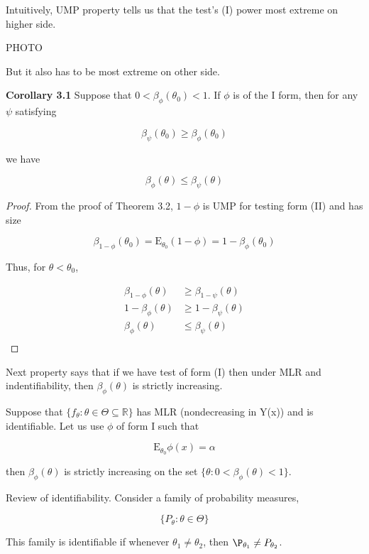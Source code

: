 \documentclass[11pt,fleqn]{book} %
\newcommand{\E}{\mathrm{E}}
\begin{document}
 Intuitively, UMP property tells us that the test's (I) power most extreme on higher side.

 PHOTO

 But it also has to be most extreme on other side.

 \textbf{Corollary 3.1} Suppose that $0 < \beta_\phi (\theta_0) <1$. If $\phi$ is of the I form, then for any $\psi$ satisfying

 		$$\beta_\psi (\theta_0) \geq \beta_\phi(\theta_0) $$

 we have 

 		$$ \beta_\phi (\theta) \leq \beta_\psi(\theta) $$

 \begin{proof}
 	From the proof of Theorem 3.2, $1 - \phi$ is UMP for testing form (II) and has size 

 			$$\beta_{1 - \phi}(\theta_0) = \E_{\theta_0} (1 - \phi) = 1 - \beta_\phi(\theta_0) $$

 	Thus, for $\theta< \theta_0$,

 			\begin{align*}
 				\beta_{1 - \phi}(\theta) &\geq \beta_{1 - \psi}(\theta)\\
 				1 - \beta_{\phi}(\theta) &\geq 1 - \beta_{\psi}(\theta)\\
 				\beta_{\phi}(\theta) &\leq \beta_{\psi}(\theta)\\
 			\end{align*}
 \end{proof}

 Next property says that if we have test of form (I) then under MLR and indentifiability, then $\beta_\phi(\theta)$ is strictly increasing. 

 \begin{theorem}[3.4]
 	Suppose that $\{f_\theta:\theta \in \Theta \subseteq \mathbb{R}\}$ has MLR (nondecreasing in Y(x)) and is identifiable. Let us use $\phi$ of form I such that

 			$$\E_{\theta_0} \phi(x) = \alpha $$

 	then $\beta_\phi (\theta)$ is strictly increasing on the set $\{\theta: 0 < \beta_\phi(\theta) < 1\}$. 
 \end{theorem}

 \begin{remark}
 	Review of identifiability. Consider a family of probability measures, 

 			$$\{P_\theta: \theta \in \Theta\} $$

 	This family is identifiable if whenever $\theta_1 \neq \theta_2$, then $\P_{\theta_1} \neq P_{\theta_2}$. 


 \end{remark}
\end{document}
